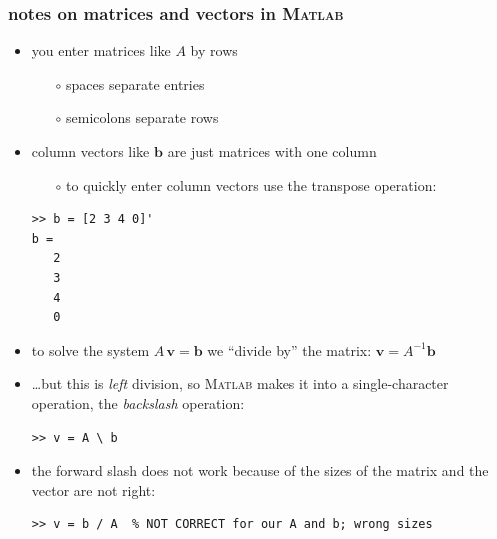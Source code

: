 \documentclass[10pt,hyperref]{beamer}
\newcommand{\bb}{\mathbf{b}}
\newcommand{\bv}{\mathbf{v}}
\newcommand{\Matlab}{\textsc{Matlab}\xspace}
\newcommand{\MO}{\Matlab}
\begin{document}
\begin{frame}[fragile]
\frametitle{notes on matrices and vectors in \MO}

\begin{itemize}
\item you enter matrices like $A$ by rows
  \begin{itemize}
  \item[$\circ$] spaces separate entries
  \item[$\circ$] semicolons separate rows
  \end{itemize}
\item column vectors like $\bb$ are just matrices with one column
  \begin{itemize}
  \item[$\circ$] to quickly enter column vectors use the transpose operation:
  \end{itemize}
\begin{Verbatim}[frame=single,fontfamily=courier,fontsize=\scriptsize]
>> b = [2 3 4 0]'
b =
   2
   3
   4
   0
\end{Verbatim}
\item to solve the system $A\, \bv = \bb$ we ``divide by'' the matrix: $\bv = A^{-1} \bb$
\item \dots but this is \emph{left} division, so \MO makes it into a single-character operation, the \emph{backslash} operation:
\begin{Verbatim}[frame=single,fontfamily=courier,fontsize=\scriptsize]
>> v = A \ b
\end{Verbatim}

\bigskip
\scriptsize
\item the forward slash does not work because of the sizes of the matrix and the vector are not right:
\begin{Verbatim}[frame=single,fontfamily=courier,fontsize=\scriptsize]
>> v = b / A  % NOT CORRECT for our A and b; wrong sizes
\end{Verbatim}
\end{itemize}
\end{frame}
\end{document}
